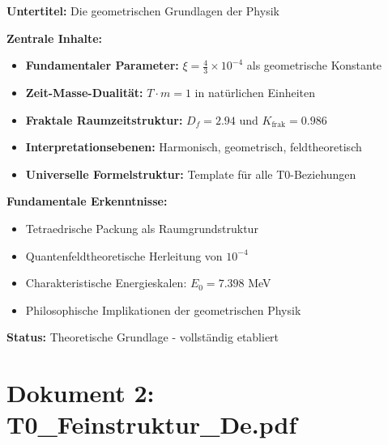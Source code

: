 \documentclass[12pt,a4paper]{article}
\newcommand{\xipar}{\xi}
\begin{document}
	\begin{documentbox}
		\textbf{Untertitel:} Die geometrischen Grundlagen der Physik
		
		\textbf{Zentrale Inhalte:}
		\begin{itemize}
			\item \textbf{Fundamentaler Parameter:} $\xipar = \frac{4}{3} \times 10^{-4}$ als geometrische Konstante
			\item \textbf{Zeit-Masse-Dualität:} $T \cdot m = 1$ in natürlichen Einheiten
			\item \textbf{Fraktale Raumzeitstruktur:} $D_f = 2.94$ und $K_{\text{frak}} = 0.986$
			\item \textbf{Interpretationsebenen:} Harmonisch, geometrisch, feldtheoretisch
			\item \textbf{Universelle Formelstruktur:} Template für alle T0-Beziehungen
		\end{itemize}
		
		\textbf{Fundamentale Erkenntnisse:}
		\begin{itemize}
			\item Tetraedrische Packung als Raumgrundstruktur
			\item Quantenfeldtheoretische Herleitung von $10^{-4}$
			\item Charakteristische Energieskalen: $E_0 = 7.398$ MeV
			\item Philosophische Implikationen der geometrischen Physik
		\end{itemize}
		
		\textbf{Status:} Theoretische Grundlage - vollständig etabliert
	\end{documentbox}
	
	\section{Dokument 2: T0\_Feinstruktur\_De.pdf}
	
\end{document}

